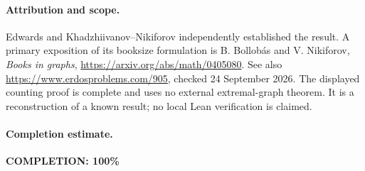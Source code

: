 \paragraph{Attribution and scope.}
Edwards and Khadzhiivanov--Nikiforov independently
established the result. A primary exposition of its
booksize formulation is B. Bollob\'as and V. Nikiforov,
\emph{Books in graphs}, \url{https://arxiv.org/abs/math/0405080}.
See also \url{https://www.erdosproblems.com/905}, checked
24 September 2026. The displayed counting proof is complete
and uses no external extremal-graph theorem. It is a
reconstruction of a known result; no local Lean verification
is claimed.

\paragraph{Completion estimate.}
\textbf{COMPLETION: 100\%}
